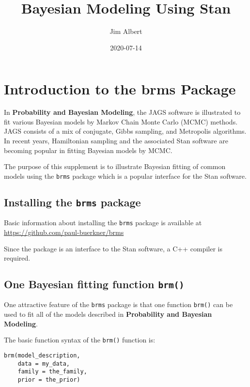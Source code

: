 \documentclass[
]{book}
\title{Bayesian Modeling Using Stan}
\author{Jim Albert}
\date{2020-07-14}
\begin{document}
\maketitle

{
\setcounter{tocdepth}{1}
\tableofcontents
}
\hypertarget{introduction-to-the-brms-package}{%
\chapter{Introduction to the brms Package}\label{introduction-to-the-brms-package}}

In \textbf{Probability and Bayesian Modeling}, the JAGS software is illustrated to fit various Bayesian models by Markov Chain Monte Carlo (MCMC) methods. JAGS consists of a mix of conjugate, Gibbs sampling, and Metropolis algorithms. In recent years, Hamiltonian sampling and the associated Stan software are becoming popular in fitting Bayesian models by MCMC.

The purpose of this supplement is to illustrate Bayesian fitting of common models using the \texttt{brms} package which is a popular interface for the Stan software.

\hypertarget{installing-the-brms-package}{%
\section{\texorpdfstring{Installing the \texttt{brms} package}{Installing the brms package}}\label{installing-the-brms-package}}

Basic information about installing the \texttt{brms} package is available at \url{https://github.com/paul-buerkner/brms}

Since the package is an interface to the Stan software, a C++ compiler is required.

\hypertarget{one-bayesian-fitting-function-brm}{%
\section{\texorpdfstring{One Bayesian fitting function \texttt{brm()}}{One Bayesian fitting function brm()}}\label{one-bayesian-fitting-function-brm}}

One attractive feature of the \texttt{brms} package is that one function \texttt{brm()} can be used to fit all of the models described in \textbf{Probability and Bayesian Modeling}.

The basic function syntax of the \texttt{brm()} function is:

\begin{verbatim}
brm(model_description, 
    data = my_data, 
    family = the_family,
    prior = the_prior)
\end{verbatim}
\end{document}
